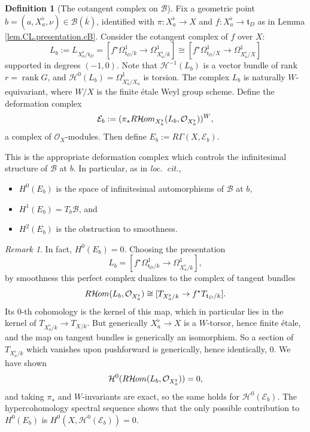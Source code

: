 \documentclass[openany]{amsbook}
\theoremstyle{definition}
\newtheorem{definition}[theorem]{Definition}
\theoremstyle{remark}
\newtheorem{remark}[theorem]{Remark}
\numberwithin{equation}{section}
\renewcommand{\O}{\mathcal{O}}
\newcommand{\cH}{\mathcal{H}}
\newcommand{\cE}{\mathcal{E}}
\newcommand{\cB}{\mathcal{B}}
\newcommand{\ol}[1]{\overline{#1}}
\renewcommand{\-}{\operatorname{-}}
\newcommand{\sHom}{\mathcal{H}\kern -.5pt om}
\newcommand{\RsHom}{R\sHom}
\newcommand{\on}[1]{\operatorname{#1}}
\newcommand{\rank}{\on{rank}}
\newcommand{\ft}{\mathfrak{t}}
\begin{document}
\begin{definition}[The cotangent complex on $\cB$]
    Fix a geometric point $b = (a, X^\flat_a, \nu) \in \cB(\ol{k})$, identified with $\pi : X_a^\flat \to X$ and $f : X_a^\flat \to \ft_D$ as in Lemma \ref{lem.CL.presentation.cB}. Consider the cotangent complex of $f$ over $X$:
    $$
        L_b := L_{X^\flat_a/\ft_D} = [f^\star \Omega^1_{\ft_D/k} \to \Omega^1_{X_a^\flat/k}] \cong [f^\star \Omega^1_{\ft_D/X} \to \Omega^1_{X_a^\flat/X}]
    $$
    supported in degrees $(-1,0)$. Note that $\cH^{-1}(L_b)$ is a vector bundle of rank $r = \rank G$, and $\cH^0(L_b) = \Omega^1_{X_a^\flat/X_a}$ is torsion. The complex $L_b$ is naturally $W$-equivariant, where $W/X$ is the finite \'etale Weyl group scheme. Define the deformation complex
    $$
        \cE_b := (\pi_\star \RsHom_{X^\flat_a}(L_b, \O_{X_a^\flat}))^W,
    $$
    a complex of $\O_X$-modules. Then define $E_b := R\Gamma(X, \cE_b)$. 
\end{definition}
This is the appropriate deformation complex which controls the infinitesimal structure of $\cB$ at $b$. In particular, as in \textit{loc.\ cit.},
\begin{itemize}
    \item $H^0(E_b)$ is the space of infinitesimal automorphisms of $\cB$ at $b$,
    \item $H^1(E_b) = T_b \cB$, and
    \item $H^2(E_b)$ is the obstruction to smoothness.
\end{itemize}

\begin{remark}\label{rmk.H0Eb,vanishes}
    In fact, $H^0(E_b) = 0$. Choosing the presentation
    $$
        L_b = [f^\star \Omega^1_{\ft_D/k} \to \Omega^1_{X_a^\flat/k}],
    $$
    by smoothness this perfect complex dualizes to the complex of tangent bundles
    $$
        \RsHom(L_b, \O_{X_a^\flat}) \cong [T_{X_a^\flat/k} \to f^\star T_{\ft_D/k}].
    $$
    Its 0-th cohomology is the kernel of this map, which in particular lies in the kernel of $T_{X_a^\flat/k} \to T_{X/k}$. But generically $X_a^\flat \to X$ is a $W$-torsor, hence finite \'etale, and the map on tangent bundles is generically an isomorphism. So a section of $T_{X_a^\flat/k}$ which vanishes upon pushforward is generically, hence identically, 0. We have shown
    $$
        \cH^0(\RsHom(L_b, \O_{X_a^\flat})) = 0,
    $$
    and taking $\pi_\star$ and $W$-invariants are exact, so the same holds for $\cH^0(\cE_b)$. The hypercohomology spectral sequence shows that the only possible contribution to $H^0(E_b)$ is $H^0(X, \cH^0(\cE_b)) = 0$. 
\end{remark}
\end{document}
